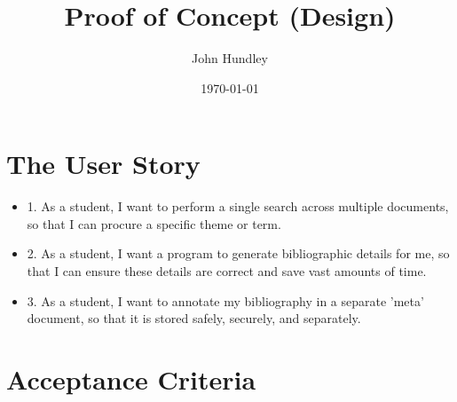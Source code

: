 \documentclass[a4paper,12pt]{article}
\title{Proof of Concept (Design)}
\author{John Hundley}
\date{\today}
\begin{document}
\maketitle

\section{The User Story}

\begin{itemize}


\item{ 1. As a student, I want to perform a single search across multiple documents, so that I can procure a specific theme or term.}


\item{2. As a student, I want a program to generate bibliographic details for me, so that I can ensure these details are correct and save vast amounts of time.}


\item{3. As a student, I want to annotate my bibliography in a separate 'meta' document, so that it is stored safely, securely, and separately.}

\end{itemize} 


\section{Acceptance Criteria}
\end{document}
